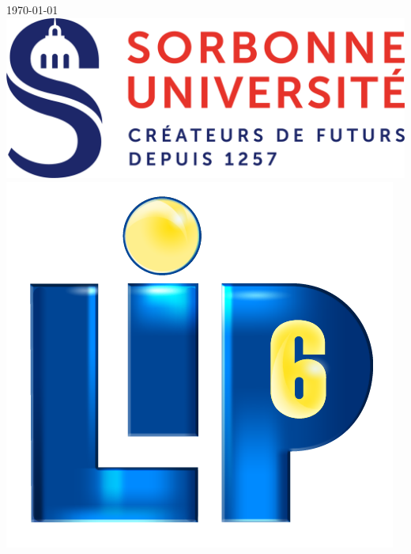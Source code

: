\begin{titlepage}


{\large \today}\\[2cm] %


\includegraphics[scale=0.35]{include/logo_sorbonne.png}  %
\hspace{1cm}
\includegraphics[scale=0.15]{include/logo_lip6.png}\\ %


\vfill %

\end{titlepage}


